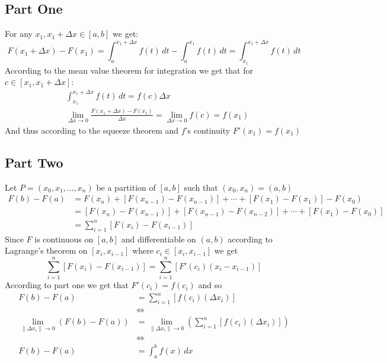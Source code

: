 \documentclass{article}
\begin{document}
	\subsection{Part One}
	For any $x_1, x_1+\Delta x\in [a,b]$ we get:
	\[
		F(x_1 + \Delta x) - F(x_1) = 
		\int_{a}^{x_1 + \Delta x}{f(t)\,dt} - \int_{a}^{x_1}{f(t)\,dt} = 
		\int_{x_1}^{x_1 + \Delta x}{f(t)\,dt}
	\]
	According to the mean value theorem for integration 
	we get that for $c \in [x_1, x_1+\Delta x]$:
	\begin{align*}
		&\int_{x_1}^{x_1 + \Delta x}{f(t)\,dt} = f(c)\Delta x \\
		&\lim_{\Delta x\to 0}{\frac{F(x_1+\Delta x) - F(x_1)}{\Delta x}}
		= \lim_{\Delta x\to 0}{f(c)}
		= f(x_1)
	\end{align*}
	And thus according to the squeeze theorem and $f$'s continuity $F'(x_1) = f(x_1)$
	\subsection{Part Two}
	Let $P = (x_0, x_1, \ldots, x_n)$ be a partition of $[a, b]$ such that $(x_0,x_n)=(a,b)$
	\begin{align*}
		F(b) - F(a) &= F(x_n) + \left[F(x_{n-1})-F(x_{n-1})\right] 
		+ \cdots + \left[F(x_{1})-F(x_{1})\right] - F(x_0) \\
		&= \left[F(x_n)-F(x_{n-1})\right] + \left[F(x_{n-1})-F(x_{n-2})\right] 
		+ \cdots + \left[F(x_1)-F(x_{0})\right] \\
	&= \sum_{i=1}^n{\left[F(x_{i})-F(x_{i-1})\right]}
	\end{align*}
	Since $F$ is continuous on $[a,b]$ and differentiable on $(a,b)$ 
	according to Lagrange's theorem on $[x_i,x_{i-1}]$ where $c_i\in [x_i,x_{i-1}]$ we get
	\[
		\sum_{i=1}^n{\left[F(x_{i})-F(x_{i-1})\right]} 
		= \sum_{i=1}^n{\left[F'(c_i)(x_i-x_{i-1})\right]}
	\]
	\newpage
	According to part one we get that $F'(c_i) = f(c_i)$ and so
	\begin{align*}
		F(b) - F(a) &= \sum_{i=1}^{n}{\left[f(c_i)(\Delta x_i)\right]} \\
		&\iff \\
		\lim_{\|\Delta x_i\|\to 0}{\left(F(b)-F(a)\right)} &= 
		\lim_{\|\Delta x_i\|\to 0}{\left(\sum_{i=1}^n{\left[f(c_i)(\Delta x_i)\right]}\right)} \\
		&\iff \\
	F(b)-F(a) &= \int_a^b{f(x)\,dx}
	\end{align*}
	
	\newpage
	
\end{document}
